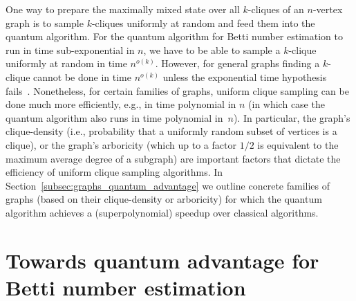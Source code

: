 \documentclass[a4paper, onecolumn, accepted=2022-08-28]{quantumarticle}
\begin{document}
One way to prepare the maximally mixed state over all $k$-cliques of an $n$-vertex graph is to sample $k$-cliques uniformly at random and feed them into the quantum algorithm.
For the quantum algorithm for Betti number estimation to run in time sub-exponential in $n$, we have to be able to sample a $k$-clique uniformly at random in time $n^{o(k)}$.
However, for general graphs finding a $k$-clique cannot be done in time $n^{o(k)}$ unless the exponential time hypothesis fails~\cite{chen:clique}.
Nonetheless, for certain families of graphs, uniform clique sampling can be done much more efficiently, e.g., in time polynomial in $n$ (in which case the quantum algorithm also runs in time polynomial in~$n$).
In particular, the graph's clique-density (i.e., probability that a uniformly random subset of vertices is a clique), or the graph's arboricity (which up to a factor $1/2$ is equivalent to the maximum average degree of a subgraph) are important factors that dictate the efficiency of uniform clique sampling algorithms.
In Section~\ref{subsec:graphs_quantum_advantage} we outline concrete families of graphs (based on their clique-density or arboricity) for which the quantum algorithm achieves a (superpolynomial) speedup over classical algorithms.

\section{Towards quantum advantage for Betti number estimation
\label{sec:quantum_advantage}}
\renewcommand{\thefootnote}{\arabic{footnote}}
\end{document}
